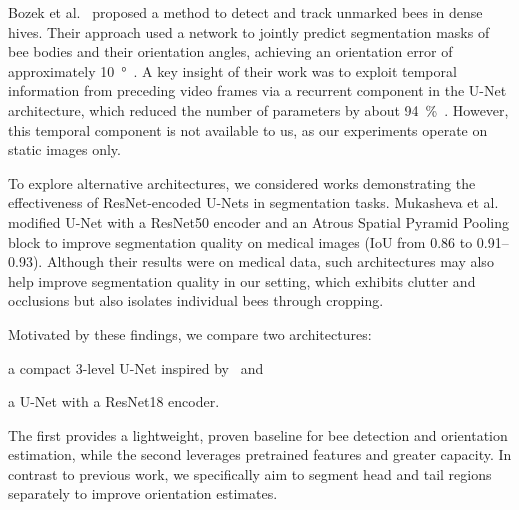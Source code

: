 Bozek et al.~\cite{bozek2021markerless, bozek2018pixel} proposed a method to detect and track unmarked bees in dense hives.
Their approach used a network to jointly predict segmentation masks of bee bodies and their orientation angles, achieving an orientation error of approximately \qty{10}{\degree}~\cite{bozek2021markerless}.
A key insight of their work was to exploit temporal information from preceding video frames via a recurrent component in the U-Net architecture, which reduced the number of parameters by about \qty{94}{\percent}~\cite{bozek2021markerless, bozek2018pixel}.
However, this temporal component is not available to us, as our experiments operate on static images only.

To explore alternative architectures, we considered works demonstrating the effectiveness of ResNet-encoded U-Nets in segmentation tasks.
Mukasheva et al.~\cite{mukasheva2024modification} modified U-Net with a ResNet50 encoder and an Atrous Spatial Pyramid Pooling block to improve segmentation quality on medical images (IoU from \qty{0.86}{} to \qtyrange{0.91}{0.93}{}).
Although their results were on medical data, such architectures may also help improve segmentation quality in our setting, which exhibits clutter and occlusions but also isolates individual bees through cropping.

Motivated by these findings, we compare two architectures:
\begin{inparaenum}[(i)]
    \item a compact 3-level U-Net inspired by~\cite{bozek2021markerless} and
    \item a U-Net with a ResNet18 encoder.
\end{inparaenum}
The first provides a lightweight, proven baseline for bee detection and orientation estimation, while the second leverages pretrained features and greater capacity.
In contrast to previous work, we specifically aim to segment head and tail regions separately to improve orientation estimates.